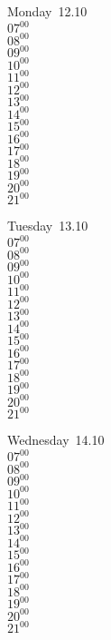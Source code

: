 \documentclass[11pt,a4paper]{book}\usepackage[]{graphicx}\usepackage[]{color}
\begin{document}
\begin{headerbox}
\end{headerbox}
\begin{weekdaybox}
  Monday~12.10\\
  { 
  \vfill
  $07^{00}$\\
$08^{00}$\\
$09^{00}$\\
$10^{00}$\\
$11^{00}$\\
$12^{00}$\\
$13^{00}$\\
$14^{00}$\\
$15^{00}$\\
$16^{00}$\\
$17^{00}$\\
$18^{00}$\\
$19^{00}$\\
$20^{00}$\\
$21^{00}$\\
  }
\end{weekdaybox}
\begin{weekdaybox}
  Tuesday~13.10\\
  { 
  \vfill
  $07^{00}$\\
$08^{00}$\\
$09^{00}$\\
$10^{00}$\\
$11^{00}$\\
$12^{00}$\\
$13^{00}$\\
$14^{00}$\\
$15^{00}$\\
$16^{00}$\\
$17^{00}$\\
$18^{00}$\\
$19^{00}$\\
$20^{00}$\\
$21^{00}$\\
  }
\end{weekdaybox}
\begin{weekdaybox}
  Wednesday~14.10\\
  { 
  \vfill
  $07^{00}$\\
$08^{00}$\\
$09^{00}$\\
$10^{00}$\\
$11^{00}$\\
$12^{00}$\\
$13^{00}$\\
$14^{00}$\\
$15^{00}$\\
$16^{00}$\\
$17^{00}$\\
$18^{00}$\\
$19^{00}$\\
$20^{00}$\\
$21^{00}$\\
  }
\end{weekdaybox}
\end{document}
